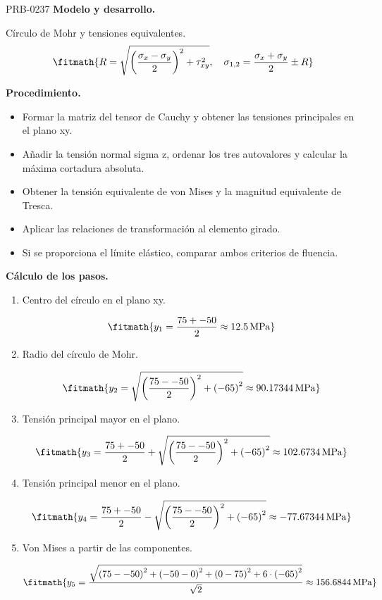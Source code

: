 \begin{studiumworked}{PRB-0237}
\textbf{Modelo y desarrollo.}

Círculo de Mohr y tensiones equivalentes.\[\fitmath{R=\sqrt{\left(\frac{\sigma_x-\sigma_y}{2}\right)^2+\tau_{xy}^{2}},\quad\sigma_{1,2}=\frac{\sigma_x+\sigma_y}{2}\pm R}\]

\textbf{Procedimiento.}\begin{itemize}\item Formar la matriz del tensor de Cauchy y obtener las tensiones principales en el plano xy.
\item Añadir la tensión normal sigma z, ordenar los tres autovalores y calcular la máxima cortadura absoluta.
\item Obtener la tensión equivalente de von Mises y la magnitud equivalente de Tresca.
\item Aplicar las relaciones de transformación al elemento girado.
\item Si se proporciona el límite elástico, comparar ambos criterios de fluencia.\end{itemize}

\textbf{Cálculo de los pasos.}

\begin{enumerate}

\item Centro del círculo en el plano xy.

\[\fitmath{y_{1}=\frac{75+-50}{2}\approx 12.5\,\mathrm{MPa}}\]

\item Radio del círculo de Mohr.

\[\fitmath{y_{2}=\sqrt{{\left(\frac{75--50}{2}\right)}^{2}+{\left(-65\right)}^{2}}\approx 90.17344\,\mathrm{MPa}}\]

\item Tensión principal mayor en el plano.

\[\fitmath{y_{3}=\frac{75+-50}{2}+\sqrt{{\left(\frac{75--50}{2}\right)}^{2}+{\left(-65\right)}^{2}}\approx 102.6734\,\mathrm{MPa}}\]

\item Tensión principal menor en el plano.

\[\fitmath{y_{4}=\frac{75+-50}{2}-\sqrt{{\left(\frac{75--50}{2}\right)}^{2}+{\left(-65\right)}^{2}}\approx -77.67344\,\mathrm{MPa}}\]

\item Von Mises a partir de las componentes.

\[\fitmath{y_{5}=\frac{\sqrt{{\left(75--50\right)}^{2}+{\left(-50-0\right)}^{2}+{\left(0-75\right)}^{2}+6\cdot {\left(-65\right)}^{2}}}{\sqrt{2}}\approx 156.6844\,\mathrm{MPa}}\]


\end{enumerate}
\end{studiumworked}
